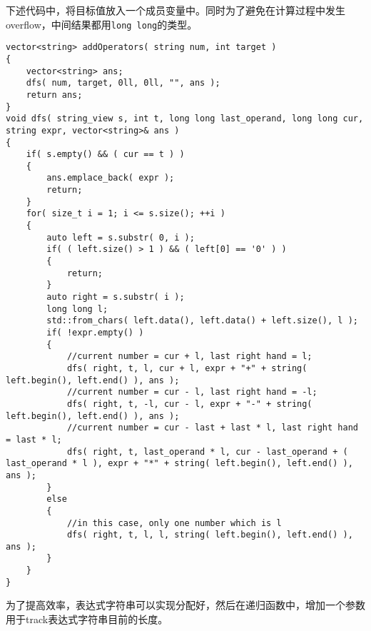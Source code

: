 下述代码中，将目标值放入一个成员变量中。同时为了避免在计算过程中发生overflow，中间结果都用\texttt{long long}的类型。
\setcounter{lstlisting}{0}
\begin{lstlisting}[style=customc, caption={Backtracking}]
vector<string> addOperators( string num, int target )
{
    vector<string> ans;
    dfs( num, target, 0ll, 0ll, "", ans );
    return ans;
}
void dfs( string_view s, int t, long long last_operand, long long cur, string expr, vector<string>& ans )
{
    if( s.empty() && ( cur == t ) )
    {
        ans.emplace_back( expr );
        return;
    }
    for( size_t i = 1; i <= s.size(); ++i )
    {
        auto left = s.substr( 0, i );
        if( ( left.size() > 1 ) && ( left[0] == '0' ) )
        {
            return;
        }
        auto right = s.substr( i );
        long long l;
        std::from_chars( left.data(), left.data() + left.size(), l );
        if( !expr.empty() )
        {
            //current number = cur + l, last right hand = l;
            dfs( right, t, l, cur + l, expr + "+" + string( left.begin(), left.end() ), ans );
            //current number = cur - l, last right hand = -l;
            dfs( right, t, -l, cur - l, expr + "-" + string( left.begin(), left.end() ), ans );
            //current number = cur - last + last * l, last right hand = last * l;
            dfs( right, t, last_operand * l, cur - last_operand + ( last_operand * l ), expr + "*" + string( left.begin(), left.end() ), ans );
        }
        else
        {
            //in this case, only one number which is l
            dfs( right, t, l, l, string( left.begin(), left.end() ), ans );
        }
    }
}
\end{lstlisting}
为了提高效率，表达式字符串可以实现分配好，然后在递归函数中，增加一个参数用于track表达式字符串目前的长度。
